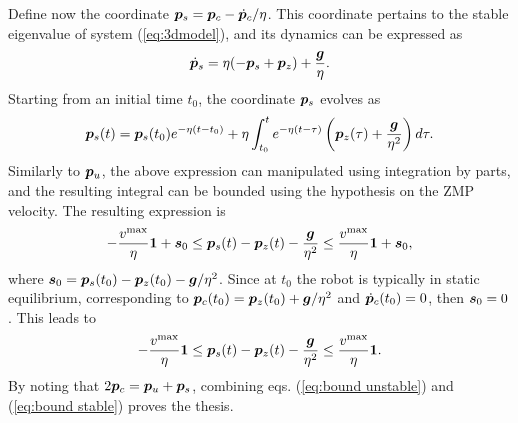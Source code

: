 Define now the coordinate ${\bm{p}}_s = {\bm{p}}_c - \dot {{\bm{p}}}_c/\eta$. This coordinate pertains to the stable eigenvalue of system (\ref{eq:3dmodel}), and its dynamics can be expressed as
\begin{equation*}
\dot{{\bm{p}}}_s = \eta(-{\bm{p}}_s + {\bm{p}}_z) + \frac{{\bm{g}}}{\eta}.
\end{equation*}
Starting from an initial time $t_0$, the coordinate ${\bm{p}}_s$ evolves as
\begin{equation*}
{\bm{p}}_s(t) = {\bm{p}}_s(t_0) e^{-\eta(t-t_0)} + \eta\int_{t_0}^t e^{-\eta(t-\tau)}\left({\bm{p}}_z(\tau)  +\frac{{\bm{g}}}{\eta^2}\right)d\tau.
\end{equation*}
Similarly to ${\bm{p}}_u$, the above expression can manipulated using integration by parts, and the resulting integral can be bounded using the hypothesis on the ZMP velocity. The resulting expression is
\begin{equation*}
-\frac{v^{\rm max}}{\eta}{\bf 1} + {\bm{s}}_0
\le
{\bm{p}}_s(t) - {\bm{p}}_z(t) - \frac{{\bm{g}}}{\eta^2}
\le
\frac{v^{\rm max}}{\eta}{\bf 1} + {\bm{s}}_0,
\end{equation*}
where ${\bm{s}}_0 = {\bm{p}}_s(t_0) - {\bm{p}}_z(t_0) - {\bm{g}}/\eta^2$. 
Since at $t_0$ the robot is typically in static equilibrium, corresponding to ${\bm{p}}_c(t_0) = {\bm{p}}_z(t_0) + {\bm{g}}/\eta^2$ and $\dot{{\bm{p}}}_c(t_0) = 0$, then ${\bm{s}}_0 = 0$. This leads to
\begin{equation}
-\frac{v^{\rm max}}{\eta}{\bf 1}\label{eq:bound stable}
\le
{\bm{p}}_s(t) - {\bm{p}}_z(t) - \frac{{\bm{g}}}{\eta^2}
\le
\frac{v^{\rm max}}{\eta}{\bf 1}.
\end{equation}
By noting that $2{\bm{p}}_c = {\bm{p}}_u + {\bm{p}}_s$, combining eqs. (\ref{eq:bound unstable}) and (\ref{eq:bound stable}) proves the thesis.
